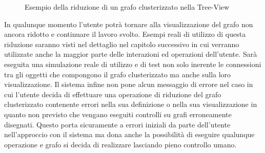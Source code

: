 {\begin{figure}[!htb]
\begin{center}
	\end{center}
	\caption{Esempio della riduzione di un grafo clusterizzato nella Tree-View \label{fig:esempioTreeRidotto}}
\end{figure}
\newline
In qualunque momento l'utente potrà tornare alla visualizzazione del grafo non ancora ridotto e continuare il lavoro svolto.
Esempi reali di utilizzo di questa riduzione saranno visti nel dettaglio nel capitolo successivo in cui verranno utilizzate anche la maggior parte delle interazioni ed operazioni dell'utente. Sarà eseguita una simulazione reale di utilizzo e di test non solo inerente le connessioni tra gli oggetti che compongono il grafo clusterizzato ma anche sulla loro visualizzazione. Il sistema infine non pone alcun messaggio di errore nel caso in cui l'utente decida di effettuare una operazione di riduzione del grafo clusterizzato contenente errori nella sua definizione o nella sua visualizzazione in quanto non previsto che vengano eseguiti controlli su grafi erroneamente disegnati. Questo porta sicuramente a errori iniziali da parte dell'utente nell'approccio con il sistema ma dona anche la possibilità di eseguire qualunque operazione e grafo si decida di realizzare lasciando pieno controllo umano.

}
